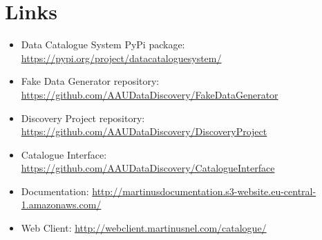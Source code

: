 \chapter{Links}\label{ch:links}

\begin{itemize}
    \item Data Catalogue System PyPi package: \url{https://pypi.org/project/datacataloguesystem/}
    \item Fake Data Generator repository: \url{https://github.com/AAUDataDiscovery/FakeDataGenerator}
    \item Discovery Project repository: \url{https://github.com/AAUDataDiscovery/DiscoveryProject}
    \item Catalogue Interface: \url{https://github.com/AAUDataDiscovery/CatalogueInterface}
    \item Documentation: \url{http://martinusdocumentation.s3-website.eu-central-1.amazonaws.com/}
    \item Web Client: \url{http://webclient.martinusnel.com/catalogue/}
\end{itemize}